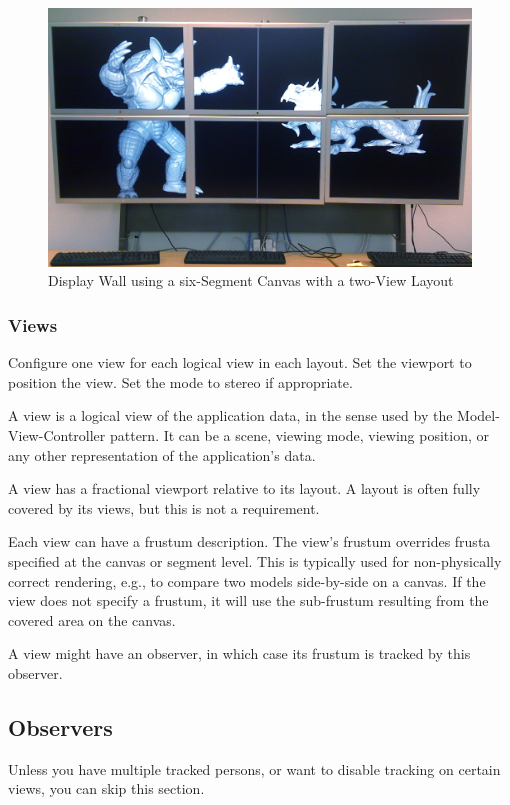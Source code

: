 \documentclass[10pt,a4]{scrartcl}
\begin{document}
\begin{figure}[ht!]\center
  \includegraphics[width=.9\textwidth]{images/wallLayout.jpg}
  {\caption{Display Wall using a six-Segment Canvas with a two-View Layout}}
\end{figure}

\subsubsection{Views}

Configure one \textsf{view} for each logical view in each layout. Set the
\textsf{viewport} to position the view. Set the mode to stereo if appropriate.

A view is a logical view of the application data, in the sense used by
the Model-View-Controller pattern. It can be a scene, viewing mode,
viewing position, or any other representation of the application's data.

A view has a fractional viewport relative to its layout.  A layout
is often fully covered by its views, but this is not a requirement.

Each view can have a frustum description. The view's frustum overrides
frusta specified at the canvas or segment level. This is typically used
for non-physically correct rendering, e.g., to compare two models
side-by-side on a canvas. If the view does not specify a frustum, it
will use the sub-frustum resulting from the covered area on the canvas.

A view might have an observer, in which case its frustum is tracked by
this observer. 

\subsection{Observers}

Unless you have multiple tracked persons, or want to disable tracking on
certain views, you can skip this section.
\end{document}
